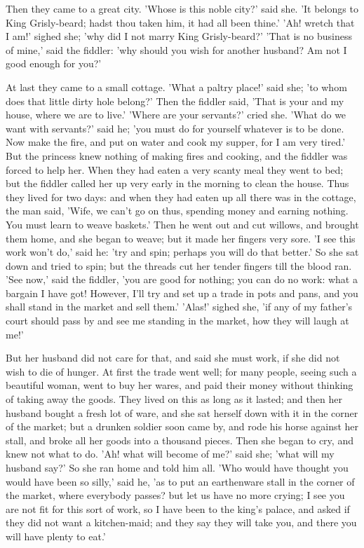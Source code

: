 \documentclass[12pt]{book}
\begin{document}
Then they came to a great city. 'Whose is this noble city?' said she.
'It belongs to King Grisly-beard; hadst thou taken him, it had all
been thine.' 'Ah! wretch that I am!' sighed she; 'why did I not marry
King Grisly-beard?' 'That is no business of mine,' said the fiddler:
'why should you wish for another husband? Am not I good enough for
you?'

At last they came to a small cottage. 'What a paltry place!' said she;
'to whom does that little dirty hole belong?' Then the fiddler said,
'That is your and my house, where we are to live.' 'Where are your
servants?' cried she. 'What do we want with servants?' said he; 'you
must do for yourself whatever is to be done. Now make the fire, and
put on water and cook my supper, for I am very tired.' But the
princess knew nothing of making fires and cooking, and the fiddler was
forced to help her. When they had eaten a very scanty meal they went
to bed; but the fiddler called her up very early in the morning to
clean the house. Thus they lived for two days: and when they had eaten
up all there was in the cottage, the man said, 'Wife, we can't go on
thus, spending money and earning nothing. You must learn to weave
baskets.' Then he went out and cut willows, and brought them home, and
she began to weave; but it made her fingers very sore. 'I see this
work won't do,' said he: 'try and spin; perhaps you will do that
better.' So she sat down and tried to spin; but the threads cut her
tender fingers till the blood ran. 'See now,' said the fiddler, 'you
are good for nothing; you can do no work: what a bargain I have got!
However, I'll try and set up a trade in pots and pans, and you shall
stand in the market and sell them.' 'Alas!' sighed she, 'if any of my
father's court should pass by and see me standing in the market, how
they will laugh at me!'

But her husband did not care for that, and said she must work, if she
did not wish to die of hunger. At first the trade went well; for many
people, seeing such a beautiful woman, went to buy her wares, and paid
their money without thinking of taking away the goods. They lived on
this as long as it lasted; and then her husband bought a fresh lot of
ware, and she sat herself down with it in the corner of the market;
but a drunken soldier soon came by, and rode his horse against her
stall, and broke all her goods into a thousand pieces. Then she began
to cry, and knew not what to do. 'Ah! what will become of me?' said
she; 'what will my husband say?' So she ran home and told him all.
'Who would have thought you would have been so silly,' said he, 'as to
put an earthenware stall in the corner of the market, where everybody
passes? but let us have no more crying; I see you are not fit for this
sort of work, so I have been to the king's palace, and asked if they
did not want a kitchen-maid; and they say they will take you, and
there you will have plenty to eat.'
\end{document}
